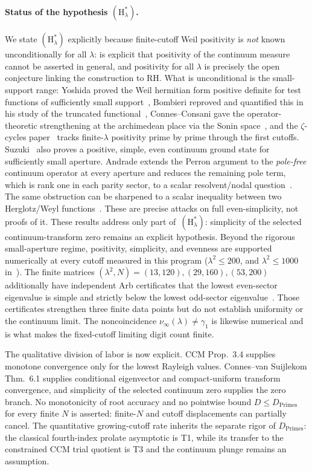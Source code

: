 \documentclass[11pt,a4paper]{article}
\begin{document}
\paragraph{Status of the hypothesis $(\mathrm{H}_\lambda^\ast)$.}
We state $(\mathrm{H}_\lambda^\ast)$ explicitly because finite-cutoff Weil
positivity is \emph{not} known unconditionally for all $\lambda$:
\cite{CCM2025} is explicit that positivity of the continuum measure cannot be
asserted in general, and positivity for all $\lambda$ is precisely the open
conjecture linking the construction to RH. What is unconditional is the
small-support range: Yoshida proved the Weil hermitian form positive definite
for test functions of sufficiently small support~\cite{Yoshida1992}, Bombieri
reproved and quantified this in his study of the truncated
functional~\cite{Bombieri2000}, Connes--Consani gave the operator-theoretic
strengthening at the archimedean place via the Sonin
space~\cite{ConnesConsaniSelecta}, and the $\zeta$-cycles
paper~\cite{ConnesConsaniZC} tracks finite-$\lambda$ positivity prime by prime
through the first cutoffs. Suzuki~\cite[Thm.~1.4]{Suzuki2026} also proves a
positive, simple, even continuum ground state for sufficiently small aperture.
Andrade extends the Perron argument to the \emph{pole-free} continuum operator
at every aperture and reduces the remaining pole term, which is rank one in
each parity sector, to a scalar resolvent/nodal question~\cite{AndradePole2026}.
The same obstruction can be sharpened to a scalar inequality between two
Herglotz/Weyl functions~\cite{AndradeHerglotz2026}. These are precise attacks
on full even-simplicity, not proofs of it. These
results address only part of~$(\mathrm{H}_\lambda^\ast)$: simplicity of
the selected continuum-transform zero remains an explicit hypothesis.
Beyond the rigorous small-aperture regime, positivity, simplicity, and evenness
are supported numerically at every cutoff measured in this program
($\lambda^2\le200$, and $\lambda^2\le1000$ in~\cite{AndrewsA}). The finite
matrices $(\lambda^2,N)=(13,120),(29,160),(53,200)$ additionally have
independent Arb certificates that the lowest even-sector eigenvalue is simple
and strictly below the lowest odd-sector eigenvalue~\cite{AndradeEven2026}.
Those certificates strengthen three finite data points but do not establish
uniformity or the continuum limit. The
noncoincidence $\nu_\infty(\lambda)\ne\gamma_1$ is likewise numerical and is
what makes the fixed-cutoff limiting digit count finite.

\noindent The qualitative division of labor is now explicit. CCM
Prop.~3.4 supplies monotone convergence only for the lowest Rayleigh values.
Connes--van Suijlekom Thm.~6.1 supplies conditional eigenvector and
compact-uniform transform convergence, and simplicity of the selected
continuum zero supplies the zero branch. No monotonicity of root accuracy and
no pointwise bound $D\le D_{\mathrm{Primes}}$ for every finite $N$ is asserted:
finite-$N$ and cutoff displacements can partially cancel. The quantitative
growing-cutoff rate inherits the separate rigor of $D_{\mathrm{Primes}}$: the
classical fourth-index prolate asymptotic is T1, while its transfer to the
constrained CCM trial quotient is T3 and the continuum plunge remains an
assumption.
\end{document}

